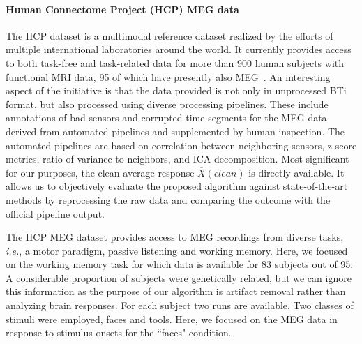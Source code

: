 \paragraph{Human Connectome Project (HCP) MEG data}

The HCP dataset is a multimodal reference dataset realized by the efforts of multiple international laboratories around the world. It currently provides access to both task-free and task-related data for more than 900 human subjects with functional MRI data, 95 of which have presently also MEG~\citep{larson2013adding}. An interesting aspect of the initiative is that the data provided is not only in unprocessed BTi format, but also processed using diverse processing pipelines. These include annotations of bad sensors and corrupted time segments for the \ac{MEG} data derived from automated pipelines and supplemented by human inspection. The automated pipelines are based on correlation between neighboring sensors, z-score metrics, ratio of variance to neighbors, and \ac{ICA} decomposition. Most significant for our purposes, the clean average response $\overbar{X}(clean)$ is directly available. It allows us to objectively evaluate the proposed algorithm against state-of-the-art methods by reprocessing the raw data and comparing the outcome with the official pipeline output.

The HCP MEG dataset provides access to MEG recordings from diverse tasks, \textit{i.e.}, a motor paradigm, passive listening and working memory. Here, we focused on the working memory task for which data is available for 83 subjects out of 95. A considerable proportion of subjects were genetically related, but we can ignore this information as the purpose of our algorithm is artifact removal rather than analyzing brain responses. For each subject two runs are available. Two classes of stimuli were employed, faces and tools. Here, we focused on the MEG data in response to stimulus onsets for the ``faces" condition.

